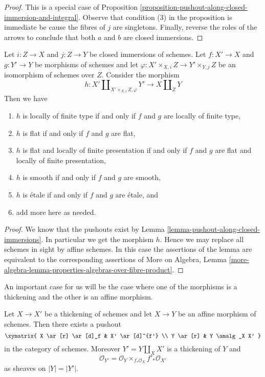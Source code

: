 \begin{proof}
This is a special case of
Proposition \ref{proposition-pushout-along-closed-immersion-and-integral}.
Observe that condition (3) in the proposition is immediate be cause
the fibres of $j$ are singletons. Finally, reverse the roles of the arrows
to conclude that both $a$ and $b$ are closed immersions.
\end{proof}

\begin{lemma}
\label{lemma-pushout-along-closed-immersions-properties-above}
Let $i : Z \to X$ and $j : Z \to Y$ be closed immersions of schemes.
Let $f : X' \to X$ and $g : Y' \to Y$ be morphisms of schemes and let
$\varphi : X' \times_{X, i} Z \to Y' \times_{Y, j} Z$
be an isomorphism of schemes over $Z$. Consider the morphism
$$
h :
X' \amalg_{X' \times_{X, i} Z, \varphi} Y'
\longrightarrow
X \amalg_Z Y
$$
Then we have
\begin{enumerate}
\item $h$ is locally of finite type if and only if $f$ and $g$ are
locally of finite type,
\item $h$ is flat if and only if $f$ and $g$ are flat,
\item $h$ is flat and locally of finite presentation if and only if
$f$ and $g$ are flat and locally of finite presentation,
\item $h$ is smooth if and only if $f$ and $g$ are smooth,
\item $h$ is \'etale if and only if $f$ and $g$ are \'etale, and
\item add more here as needed.
\end{enumerate}
\end{lemma}

\begin{proof}
We know that the pushouts exist by
Lemma \ref{lemma-pushout-along-closed-immersions}.
In particular we get the morphism $h$.
Hence we may replace all schemes in sight by
affine schemes. In this case the assertions of the lemma
are equivalent to the corresponding assertions of
More on Algebra, Lemma
\ref{more-algebra-lemma-properties-algebras-over-fibre-product}.
\end{proof}

\noindent
An important case for us will be the case where one of the morphisms
is a thickening and the other is an affine morphism.

\begin{lemma}
\label{lemma-pushout-along-thickening}
Let $X \to X'$ be a thickening of schemes and let $X \to Y$ be an affine
morphism of schemes. Then there exists a pushout
$$
\xymatrix{
X \ar[r] \ar[d]_f
&
X' \ar[d]^{f'}
\\
Y \ar[r]
&
Y \amalg_X X'
}
$$
in the category of schemes. Moreover $Y' = Y \amalg_X X'$ is a
thickening of $Y$ and
$$
\mathcal{O}_{Y'} = \mathcal{O}_Y \times_{f_*\mathcal{O}_X} f'_*\mathcal{O}_{X'}
$$
as sheaves on $|Y| = |Y'|$.
\end{lemma}

